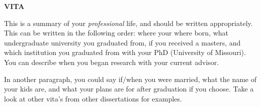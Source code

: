 \newpage
{}

\centerline{\bf \large VITA}
\vskip 10mm %
This is a summary of your {\it professional} life, and should be written appropriately.  This can be written in the following order:  where your where born, what undergraduate university you graduated from, if you received a masters, and which institution you graduated from with your PhD (University of Missouri).  You can describe when you began research with your current advisor. \par
In another paragraph, you could say if/when you were married, what the name of your kids are, and what your plans are for after graduation if you choose.  Take a look at other vita's from other dissertations for examples.
